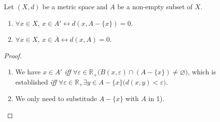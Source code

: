 \documentclass[openany]{book}
\begin{document}
\begin{theorem}
Let $(X,d)$ be a metric space and $A$ be a non-empty subset of $X$.
\begin{enumerate}[label=\arabic*)]
\item $\forall x\in X$, $x\in A' \leftrightarrow d(x,A-\{x\}) = 0$.
\item $\forall x\in X$, $x\in \overline A \leftrightarrow d(x,A)=0$.
\end{enumerate}
\end{theorem}
\begin{proof}
\begin{enumerate}[label=\arabic*)]
\item We have $x\in A' $ \emph{iff} $\forall \varepsilon\in \mathbb R_+\big(
	B (x,\varepsilon) \cap (A-\{x\}) \neq \varnothing\big)$, 
which is established \emph{iff} $\forall \varepsilon \in \mathbb R_+\exists y\in A-\{x\}\big(
	d(x,y) <\varepsilon\big)$.
\item We only need to substitude $A-\{x\}$ with $A$ in 1).
\end{enumerate}
\end{proof}
\end{document}
